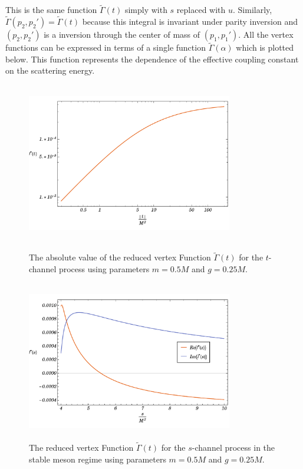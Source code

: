 \documentclass{article}
\begin{document}
This is the same function $\tilde{\Gamma}(t)$ simply with $s$ replaced with $u$. Similarly, $\tilde{\Gamma}(p_2, p_2') = \tilde{\Gamma}(t)$ because this integral is invariant under parity inversion and $(p_2, p_2')$ is a inversion through the center of mass of $(p_1, p_1')$.
All the vertex functions can be expressed in terms of a single function $\tilde{\Gamma}(\alpha)$ which is plotted below. This function represents the dependence of the effective coupling constant on the scattering energy.

\begin{figure}[!htb]
    \centering
    \begin{minipage}[b]{.45\textwidth}
        \centering
        \includegraphics[width=9cm, height=7cm]	{Gamma-t-channel}
        \caption{The absolute value of the reduced vertex Function $\tilde{\Gamma}(t)$ for the $t$-channel process using parameters $m = 0.5M$ and $g = 0.25M$.}
        \label{fig:gamma1}
    \end{minipage}%
    \hfill
    \begin{minipage}[b]{0.45\textwidth}
        \centering
        \includegraphics[width=9cm, height=7cm]{Gamma-s-channel}
        \caption{The reduced vertex Function $\tilde{\Gamma}(t)$ for the $s$-channel process in the stable meson regime using parameters $m = 0.5M$ and $g = 0.25M$.}
        \label{fig:gamma1}
    \end{minipage}
\end{figure}
\end{document}
